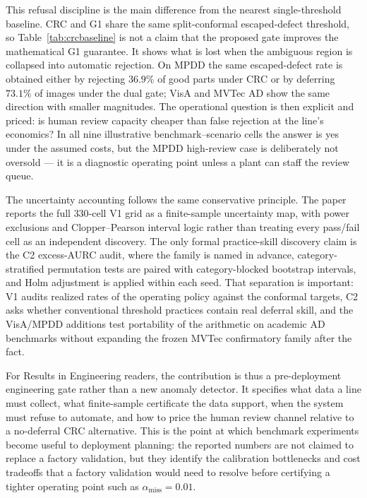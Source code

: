 \documentclass[preprint,11pt]{elsarticle}
\begin{document}
This refusal discipline is the main difference from the nearest single-threshold baseline. CRC and
G1 share the same split-conformal escaped-defect threshold, so Table~\ref{tab:crcbaseline} is not a
claim that the proposed gate improves the mathematical G1 guarantee. It shows what is lost when the
ambiguous region is collapsed into automatic rejection. On MPDD the same escaped-defect rate is
obtained either by rejecting $36.9\%$ of good parts under CRC or by deferring $73.1\%$ of images under
the dual gate; VisA and MVTec AD show the same direction with smaller magnitudes. The operational
question is then explicit and priced: is human review capacity cheaper than false rejection at the
line's economics? In all nine illustrative benchmark--scenario cells the answer is yes under the
assumed costs, but the MPDD high-review case is deliberately not oversold --- it is a diagnostic
operating point unless a plant can staff the review queue.

The uncertainty accounting follows the same conservative principle. The paper reports the full
$330$-cell V1 grid as a finite-sample uncertainty map, with power exclusions and Clopper--Pearson
interval logic rather than treating every pass/fail cell as an independent discovery. The only
formal practice-skill discovery claim is the C2 excess-AURC audit, where the family is named in
advance, category-stratified permutation tests are paired with category-blocked bootstrap intervals,
and Holm adjustment is applied within each seed. That separation is important: V1 audits realized
rates of the operating policy against the conformal targets, C2 asks whether conventional threshold
practices contain real deferral skill, and the VisA/MPDD additions test portability of the arithmetic
on academic AD benchmarks without expanding the frozen MVTec confirmatory family after the fact.

For Results in Engineering readers, the contribution is thus a pre-deployment engineering gate
rather than a new anomaly detector. It specifies what data a line must collect, what finite-sample
certificate the data support, when the system must refuse to automate, and how to price the human
review channel relative to a no-deferral CRC alternative. This is the point at which benchmark
experiments become useful to deployment planning: the reported numbers are not claimed to replace a
factory validation, but they identify the calibration bottlenecks and cost tradeoffs that a factory
validation would need to resolve before certifying a tighter operating point such as
$\alpha_{\text{miss}}=0.01$.
\end{document}
